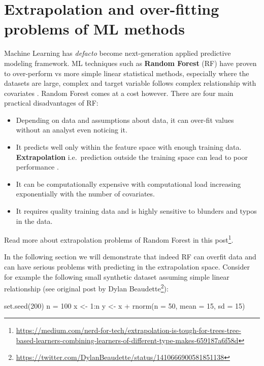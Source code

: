 \documentclass[
  graybox,natbib,nospthms]{svmono}
\newenvironment{Shaded}{\begin{snugshade}}{\end{snugshade}}
\newcommand{\AttributeTok}[1]{\textcolor[rgb]{0.61,0.61,0.61}{#1}}
\newcommand{\DecValTok}[1]{\textcolor[rgb]{0.06,0.06,0.06}{#1}}
\newcommand{\FunctionTok}[1]{\textcolor[rgb]{0,0,0}{#1}}
\newcommand{\NormalTok}[1]{#1}
\newcommand{\OtherTok}[1]{\textcolor[rgb]{0.37,0.37,0.37}{#1}}
\newcommand{\SpecialCharTok}[1]{\textcolor[rgb]{0,0,0}{#1}}
\providecommand{\tightlist}{%
  \setlength{\itemsep}{0pt}\setlength{\parskip}{0pt}}
\providecommand{\tightlist}{\setlength{\itemsep}{0pt}\setlength{\parskip}{0pt}}
\renewcommand{\href}[2]{#2 (\url{#1})}
\renewcommand{\href}[2]{#2\footnote{\url{#1}}}
\begin{document}
\hypertarget{extrapolation-and-over-fitting-problems-of-ml-methods}{%
\section{Extrapolation and over-fitting problems of ML methods}\label{extrapolation-and-over-fitting-problems-of-ml-methods}}

Machine Learning has \emph{defacto} become next-generation applied predictive modeling
framework. ML techniques such as \textbf{Random Forest} (RF) have proven to
over-perform vs more simple linear statistical methods, especially where
the datasets are large, complex and target variable follows complex
relationship with covariates \citep{hengl2018random}. Random Forest comes at a cost
however. There are four main practical disadvantages of RF:

\begin{itemize}
\tightlist
\item
  Depending on data and assumptions about data, it can over-fit values
  without an analyst even noticing it.\\
\item
  It predicts well only within the feature space with enough training
  data. \textbf{Extrapolation} i.e.~prediction outside the training space can
  lead to poor performance \citep{meyerPebesma2020}.\\
\item
  It can be computationally expensive with computational load increasing
  exponentially with the number of covariates.\\
\item
  It requires quality training data and is highly sensitive to blunders and
  typos in the data.
\end{itemize}

Read more about extrapolation problems of Random Forest in \href{https://medium.com/nerd-for-tech/extrapolation-is-tough-for-trees-tree-based-learners-combining-learners-of-different-type-makes-659187a6f58d}{this post}.

In the following section we will demonstrate that indeed RF can overfit
data and can have serious problems with predicting in the extrapolation
space. Consider for example the following small synthetic dataset assuming
simple linear relationship (see \href{https://twitter.com/DylanBeaudette/status/1410666900581851138}{original post by Dylan Beaudette}):

\begin{Shaded}
\begin{Highlighting}[]
\FunctionTok{set.seed}\NormalTok{(}\DecValTok{200}\NormalTok{)}
\NormalTok{n }\OtherTok{=} \DecValTok{100}
\NormalTok{x }\OtherTok{\textless{}{-}} \DecValTok{1}\SpecialCharTok{:}\NormalTok{n}
\NormalTok{y }\OtherTok{\textless{}{-}}\NormalTok{ x }\SpecialCharTok{+} \FunctionTok{rnorm}\NormalTok{(}\AttributeTok{n =} \DecValTok{50}\NormalTok{, }\AttributeTok{mean =} \DecValTok{15}\NormalTok{, }\AttributeTok{sd =} \DecValTok{15}\NormalTok{)}
\end{Highlighting}
\end{Shaded}
\end{document}
